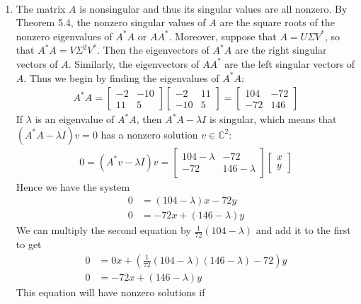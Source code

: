 \documentclass[12pt]{article}
\newenvironment{sol}[1][Solution]{\begin{trivlist}
		\item[\hskip \labelsep {\bfseries #1:}]}{\end{trivlist}}
\begin{document}
\begin{sol}
	\
	\begin{enumerate}[label=(\alph*)]
		\item The matrix $A$ is nonsingular and thus its singular values are all nonzero. By Theorem 5.4,
		the nonzero singular values of $A$ are the square roots of the nonzero eigenvalues of $A^*A$ or $AA^*$.
		Moreover, suppose that $A=U\Sigma V^*$, so that $A^*A=V\Sigma^2V^*$. Then the eigenvectors of
		$A^*A$ are the right singular vectors of $A$. Similarly, the eigenvectors of $AA^*$ are the left
		singular vectors of $A$. Thus we begin by finding the eigenvalues of $A^*A$:
		\begin{align*}
			A^*A =
			\begin{bmatrix}
				-2 & -10\\
				11 & 5
			\end{bmatrix}
			\begin{bmatrix}
				-2 & 11\\
				-10 & 5
			\end{bmatrix}
			=
			\begin{bmatrix}
				104 & -72\\
				-72 & 146
			\end{bmatrix}
		\end{align*}
		If $\lambda$ is an eigenvalue of $A^*A$, then $A^*A-\lambda I$ is singular, which means that
		$(A^*A-\lambda I)v=0$ has a nonzero solution $v\in\mathbb{C}^2$:
		\begin{align*}
			0 =(A^*v-\lambda I)v= \begin{bmatrix}
				104-\lambda & -72\\
				-72 & 146-\lambda
			\end{bmatrix}
			\begin{bmatrix}
				x\\
				y
			\end{bmatrix}
		\end{align*}
		Hence we have the system
		\begin{align*}
			0&=(104-\lambda)x -72y\\
			0 &= -72x + (146-\lambda)y
		\end{align*}
		We can multiply the second equation by $\frac{1}{72}(104-\lambda)$ and add it to the first to
		get
		\begin{align*}
			0 &= 0x +\left(\frac{1}{72}(104-\lambda)(146-\lambda)-72\right)y \\
			0 &= -72x + (146-\lambda)y
		\end{align*}
		This equation will have nonzero solutions if

\end{enumerate}
\end{sol}
\end{document}
